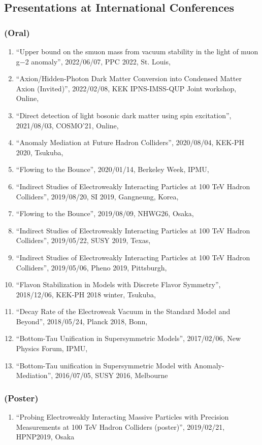 \documentclass[12pt]{article}
\begin{document}
\subsection*{Presentations at International Conferences}
\subsubsection*{(Oral)}
\begin{enumerate}
 \item ``Upper bound on the smuon mass from vacuum stability in the light of muon g−2 anomaly'', 2022/06/07, PPC 2022, St. Louis,\item ``Axion/Hidden-Photon Dark Matter Conversion into Condensed Matter Axion (Invited)'', 2022/02/08, KEK IPNS-IMSS-QUP Joint workshop, Online,\item ``Direct detection of light bosonic dark matter using spin excitation'', 2021/08/03, COSMO'21, Online,\item ``Anomaly Mediation at Future Hadron Colliders'', 2020/08/04, KEK-PH 2020, Tsukuba,\item ``Flowing to the Bounce'', 2020/01/14, Berkeley Week, IPMU,\item ``Indirect Studies of Electroweakly Interacting Particles at 100 TeV Hadron Colliders'', 2019/08/20, SI 2019, Gangneung, Korea,\item ``Flowing to the Bounce'', 2019/08/09, NHWG26, Osaka,\item ``Indirect Studies of Electroweakly Interacting Particles at 100 TeV Hadron Colliders'', 2019/05/22, SUSY 2019, Texas,\item ``Indirect Studies of Electroweakly Interacting Particles at 100 TeV Hadron Colliders'', 2019/05/06, Pheno 2019, Pittsburgh,\item ``Flavon Stabilization in Models with Discrete Flavor Symmetry'', 2018/12/06, KEK-PH 2018 winter, Tsukuba,\item ``Decay Rate of the Electroweak Vacuum in the Standard Model and Beyond'', 2018/05/24, Planck 2018, Bonn,\item ``Bottom-Tau Unification in Supersymmetric Models'', 2017/02/06, New Physics Forum, IPMU,\item ``Bottom-Tau unification in Supersymmetric Model with Anomaly-Mediation'', 2016/07/05, SUSY 2016, Melbourne
\end{enumerate}
\subsubsection*{(Poster)}
\begin{enumerate}
 \item ``Probing Electroweakly Interacting Massive Particles with Precision Measurements at 100 TeV Hadron Colliders (poster)'', 2019/02/21, HPNP2019, Osaka
\end{enumerate}
\end{document}

